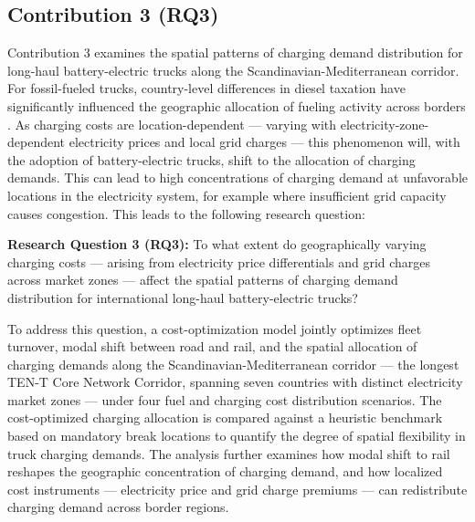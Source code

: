     \subsection{Contribution 3 (RQ3)}
Contribution 3 examines the spatial patterns of charging
  demand distribution for long-haul battery-electric trucks along the Scandinavian-Mediterranean corridor. For fossil-fueled trucks, country-level differences in diesel taxation have significantly influenced the geographic allocation of fueling activity across borders \cite{EC_WeeklyOilBulletin}. As charging costs are location-dependent — varying with electricity-zone-dependent electricity prices and local grid charges \cite{Lanz2022, hildermeier2024power} — this phenomenon will, with the adoption of battery-electric trucks, shift to the allocation of charging demands. This can lead to high concentrations of charging demand at unfavorable locations in the electricity system, for example where insufficient grid capacity causes congestion. This leads to the following research question:

    \textbf{Research Question 3 (RQ3):} To what extent do geographically varying charging costs — arising from electricity price differentials and grid charges across market zones — affect the spatial patterns of charging demand distribution for international long-haul battery-electric trucks?

  To address this question, a cost-optimization model jointly optimizes fleet turnover, modal shift between road and rail, and the spatial allocation of charging demands along the Scandinavian-Mediterranean corridor --- the longest TEN-T    
  Core Network Corridor, spanning seven countries with distinct electricity market zones --- under four fuel and charging cost distribution scenarios. The cost-optimized charging allocation is compared against a heuristic benchmark based on mandatory break locations to quantify the degree of spatial flexibility in truck charging demands. The analysis further examines how modal shift to rail reshapes the geographic concentration of charging demand, and how localized cost instruments — electricity price and grid charge premiums — can redistribute charging demand across border regions.    

